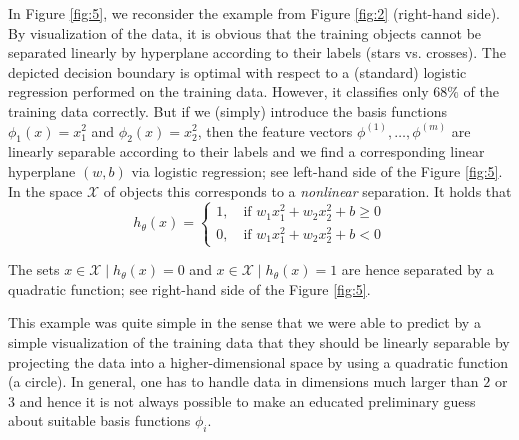 \begin{example}
In Figure \ref{fig:5}, we reconsider the example from Figure \ref{fig:2} (right-hand side). By visualization of the data, it is obvious that the training objects cannot
be separated linearly by hyperplane according to their labels (stars vs. crosses). The depicted decision boundary is optimal with respect to a (standard) logistic regression performed on the training data. However, it classifies only $68\%$ of the training data correctly. But if we (simply) introduce the basis functions $\phi_1(x)=x_1^2$ and $\phi_2(x)=x_2^2$, then the feature vectors $\phi^{(1)}, \dots, \phi^{(m)}$ are linearly separable according to their labels and we find a corresponding linear hyperplane
$(w, b)$ via logistic regression; see left-hand side of the Figure \ref{fig:5}. In the space $\mathcal{X}$ of objects this corresponds to a \emph{nonlinear} separation. It holds that
\begin{equation}
    h_{\theta}(x)=
    \begin{cases}
        1, \quad \text{if }w_1x_1^2 + w_2x_2^2 +b \geq 0\\
        0, \quad \text{if }w_1x_1^2 + w_2x_2^2 +b < 0
    \end{cases}
    \label{eqn:26}
\end{equation}

The sets $x \in \mathcal{X}\mid h_{\theta}(x)=0$ and $x \in \mathcal{X}\mid h_{\theta}(x)=1$ are hence separated by a quadratic function; see right-hand side of the Figure \ref{fig:5}. 
\end{example}

This example was quite simple in the sense that we were able to predict by a simple visualization of the training data that they should be linearly separable by projecting the data into a higher-dimensional space by using a quadratic function (a circle). In general, one has to handle data in dimensions much larger than $2$ or $3$ and hence it is not always possible to make an educated preliminary guess about suitable basis functions $\phi_i$.\\

